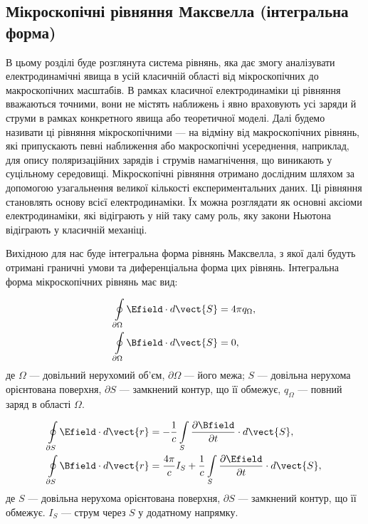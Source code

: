 \subsection*{Мікроскопічні рівняння Максвелла (інтегральна форма)}


В цьому розділі буде розглянута система рівнянь, яка дає змогу аналізувати електродинамічні явища в усій класичній
області від мікроскопічних до макроскопічних масштабів. В рамках класичної електродинаміки ці рівняння вважаються
точними, вони не містять наближень і явно враховують усі заряди й струми в рамках конкретного явища або теоретичної
моделі. Далі будемо називати ці рівняння мікроскопічними --- на відміну від макроскопічних рівнянь, які припускають
певні наближення або макроскопічні усереднення, наприклад, для опису поляризаційних зарядів і струмів намагнічення, що
виникають у суцільному середовищі. Мікроскопічні рівняння отримано дослідним шляхом за допомогою узагальнення великої
кількості експериментальних даних. Ці рівняння становлять основу всієї електродинаміки. Їх можна розглядати як основні
аксіоми електродинаміки, які відіграють у ній таку саму роль, яку закони Ньютона відіграють у класичній механіці.

Вихідною для нас буде інтегральна форма рівнянь Максвелла, з якої далі будуть отримані граничні умови та диференціальна
форма цих рівнянь. Інтегральна форма мікроскопічних рівнянь має вид:

\begin{align}
	\oint\limits_{\partial\Omega} \Efield\cdot d\vect{S} & = 4\pi q_{\Omega}\label{Int_I}, \\
	\oint\limits_{\partial\Omega} \Bfield\cdot d\vect{S} & = 0   \label{Int_II},           \\
\end{align}
де $\Omega$ --- довільний нерухомий об'єм, $\partial\Omega$ --- його межа; $S$ --- довільна нерухома орієнтована
поверхня, $\partial S$ --- замкнений контур, що її обмежує, $q_{\Omega}$ --- повний заряд в області $\Omega$.

\begin{align}
	\oint\limits_{\partial S} \Efield\cdot d\vect{r} & = - \frac1c \int\limits_S \frac{\partial\Bfield}{\partial t}\cdot d\vect{S}  \label{Int_III}, \\
	\oint\limits_{\partial S} \Bfield\cdot d\vect{r} & =\dfrac{4\pi}{c} I_S +\frac{1}{c} \int\limits_S
	\frac{\partial\Efield}{\partial t}\cdot d\vect{S}  \label{Int_IV},
\end{align}
де $S$ --- довільна нерухома орієнтована поверхня, $\partial S$ --- замкнений контур, що її обмежує. $I_S$ --- струм
через $S$ у додатному напрямку.

